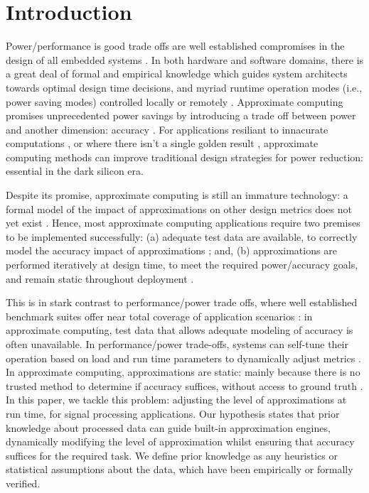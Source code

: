 \section{Introduction}

Power/performance is good trade offs are well established compromises in the design of all embedded systems \cite{das2016reliability}. In both hardware and software domains, there is a great deal of formal and empirical knowledge which guides system architects towards optimal design time decisions, and myriad runtime operation modes (i.e., power saving modes) controlled locally or remotely \cite{senni2016non}. Approximate computing promises unprecedented power savings by introducing a trade off between power and another dimension: accuracy \cite{mittal2016survey}. For applications resiliant to innacurate computations \cite{xu2016approximate}, or where there isn't a single golden result \cite{venkataramani2016approximate}, approximate computing methods can improve traditional design strategies for power reduction: essential in the dark silicon era.
\par Despite its promise, approximate computing is still an immature technology: a formal model of the impact of approximations on other design metrics does not yet exist \cite{venkataramani2015approximate}. Hence, most approximate computing applications require two premises to be implemented successfully: (a) adequate test data are available, to correctly model the accuracy impact of approximations \cite{yazdanbakhsh2017axbench}; and, (b) approximations are performed iteratively at design time, to meet the required power/accuracy goals, and remain static throughout deployment \cite{nepal2016automated}.
\par This is in stark contrast to performance/power trade offs, where well established benchmark suites offer near total coverage of application scenarios \cite{henning2000spec}: in approximate computing, test data that allows adequate modeling of accuracy is often unavailable. In performance/power trade-offs, systems can self-tune their operation based on load and run time parameters to dynamically adjust metrics \cite{Vassiliadis:2015:PMR:2858788.2688546}. In approximate computing, approximations are static: mainly because there is no trusted method to determine if accuracy suffices, without access to ground truth \cite{xu2016approximate}. In this paper, we tackle this problem:  adjusting the level of approximations at run time, for signal processing applications. Our hypothesis states that prior knowledge about processed data can guide built-in approximation engines, dynamically modifying the level of approximation whilst ensuring that accuracy suffices for the required task. We define prior knowledge as any heuristics or statistical assumptions about the data, which have been empirically or formally verified.


